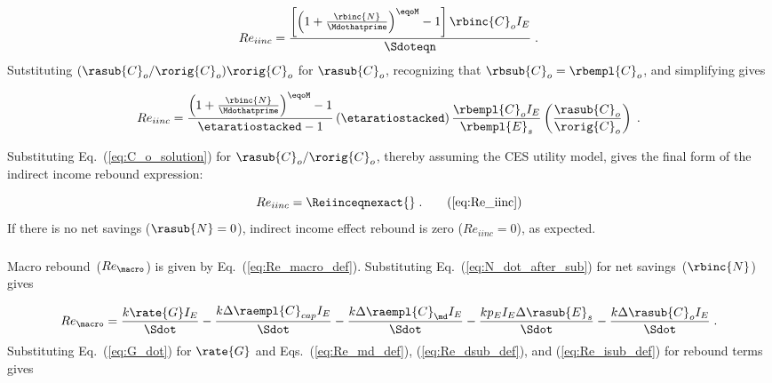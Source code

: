 \begin{equation}
  Re_{iinc} = \frac{\left[ \left( 1 + \frac{\rbinc{N}}{\Mdothatprime} \right)^{\eqoM} - 1  \right] 
              \rbinc{C}_o I_E}{\Sdoteqn} \; .
\end{equation}
%
Sutstituting $(\rasub{C}_o/\rorig{C}_o) \rorig{C}_o$ for $\rasub{C}_o$,  
recognizing that $\rbsub{C}_o = \rbempl{C}_o$, and simplifying gives 

\begin{equation}
  Re_{iinc} = \frac{\left( 1 + \frac{\rbinc{N}}{\Mdothatprime} \right)^{\eqoM} - 1}{\etaratiostacked - 1} 
              \left( \etaratiostacked \right)
              \frac{\rbempl{C}_o I_E}{\rbempl{E}_s}
              \left( \frac{\rasub{C}_o}{\rorig{C}_o} \right) \; .
\end{equation}

Substituting Eq.~(\ref{eq:C_o_solution}) 
for $\rasub{C}_o / \rorig{C}_o$, 
thereby assuming the CES utility model,
gives the final form 
of the indirect income rebound expression:

\begin{equation}
  Re_{iinc} = \Reiinceqnexact{} \; . \tag{\ref{eq:Re_iinc}}
\end{equation}
%
If there is no net savings ($\rasub{N} = 0$), 
indirect income effect rebound is zero ($Re_{iinc} = 0$), as expected.


\subsubsection{\Macroeffect{}} 
\label{sec:Re_macro}

Macro rebound~($Re_{\macro}$) is given by Eq.~(\ref{eq:Re_macro_def}).
Substituting Eq.~(\ref{eq:N_dot_after_sub}) for net savings~($\rbinc{N}$) gives

\begin{equation}
  Re_{\macro} = \frac{k \rate{G} I_E}{\Sdot}
                                - \frac{k \Delta \raempl{C}_{cap} I_E}{\Sdot}
                                - \frac{k \Delta \raempl{C}_{\md} I_E}{\Sdot}
                                - \frac{k p_E I_E \Delta \rasub{E}_s}{\Sdot}
                                - \frac{k \Delta \rasub{C}_o I_E}{\Sdot} \; .
\end{equation}
%
Substituting Eq.~(\ref{eq:G_dot}) for $\rate{G}$
and Eqs.~(\ref{eq:Re_md_def}), (\ref{eq:Re_dsub_def}), and (\ref{eq:Re_isub_def})
for rebound terms gives

